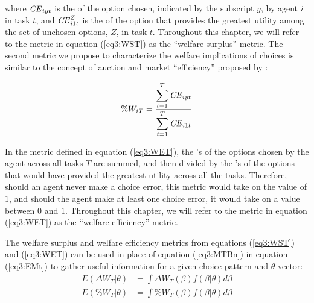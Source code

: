 \documentclass[../main.tex]{subfiles}
\begin{document}
\noindent where ${\mathit{CE}}_{iyt}$ is the {\CE} of the option chosen, indicated by the subscript $y$, by agent $i$ in task $t$, and ${\mathit{CE}}_{i1t}^Z$ is the {\CE} of the option that provides the greatest utility among the set of unchosen options, $Z$, in task $t$.
Throughout this chapter, we will refer to the metric in equation (\ref{eq3:WST}) as the \enquote{welfare surplus} metric.
The second metric we propose to characterize the welfare implications of choices is similar to the concept of auction and market \enquote{efficiency} proposed by \textcite{Plott1978}:

\begin{equation}
	\label{eq3:WET}
	\%W_{iT} = \frac{\displaystyle\sum_{t=1}^{T} {\mathit{CE}}_{iyt} }{\displaystyle\sum_{t=1}^{T} {\mathit{CE}}_{i1t}}
\end{equation}

\noindent In the metric defined in equation (\ref{eq3:WET}), the {\CE}'s of the options chosen by the agent across all tasks $T$ are summed, and then divided by the {\CE}'s of the options that would have provided the greatest utility across all the tasks.
Therefore, should an agent never make a choice error, this metric would take on the value of $1$, and should the agent make at least one choice error, it would take on a value between $0$ and $1$.{\footnotemark}
Throughout this chapter, we will refer to the metric in equation (\ref{eq3:WET}) as the \enquote{welfare efficiency} metric.

\addtocounter{footnote}{-1}

The welfare surplus and welfare efficiency metrics from equations (\ref{eq3:WST}) and (\ref{eq3:WET}) can be used in place of equation (\ref{eq3:MTBn}) in equation (\ref{eq3:EMt}) to gather useful information for a given choice pattern and $\theta$ vector:
\begin{align}
	E( \Delta W_T | \theta) &= \int \Delta W_T(\beta) f(\beta | \theta) d \beta \label{eq3:EWST}\\
	E( \% W_T | \theta) &= \int \% W_T(\beta) f(\beta | \theta) d \beta \label{eq3:EWET}
\end{align}
\end{document}
